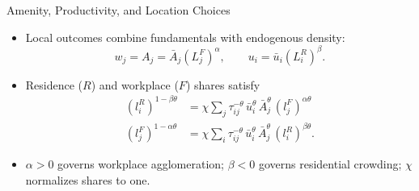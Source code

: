 \documentclass[11pt,aspectratio=169]{beamer}
\begin{document}
\begin{frame}{Amenity, Productivity, and Location Choices}
\begin{itemize}\small
  \item Local outcomes combine fundamentals with endogenous density:
  \vspace{-0.5em}\begin{equation}\label{eq:agglom}
    w_j = A_j = \bar A_j\left(L_j^F\right)^\alpha,
    \qquad
    u_i=\bar u_i\left(L_i^R\right)^\beta.
  \end{equation}
  \vspace{-0.4em}
  \item Residence ($R$) and workplace ($F$) shares satisfy
  \vspace{-0.2em}
  \begin{align}
  (l_i^R)^{1-\beta\theta} & = \chi \sum_j\tau_{ij}^{-\theta}\,\bar u_i^{\theta}\,\bar A_j^{\theta}\,(l_j^F)^{\alpha\theta} \label{eq:clear1} \\
  (l_j^F)^{1-\alpha\theta} & = \chi \sum_i\tau_{ij}^{-\theta}\,\bar u_i^{\theta}\,\bar A_j^{\theta}\,(l_i^R)^{\beta\theta}. \label{eq:clear2}
  \end{align}
  \vspace{-0.7em}
  \item $\alpha>0$ governs workplace agglomeration; $\beta<0$ governs residential crowding; $\chi$ normalizes shares to one.
\end{itemize}
\end{frame}
\end{document}
